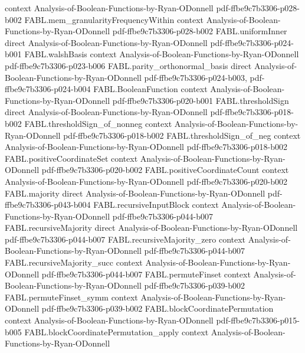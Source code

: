 \begin{theorem}
  {context}
  {Analysis-of-Boolean-Functions-by-Ryan-ODonnell}
  {pdf-ffbe9c7b3306-p028-b002}
\proofstep
  {FABL.mem_granularityFrequencyWithin}
  {context}
  {Analysis-of-Boolean-Functions-by-Ryan-ODonnell}
  {pdf-ffbe9c7b3306-p028-b002}
\proofstep
  {FABL.uniformInner}
  {direct}
  {Analysis-of-Boolean-Functions-by-Ryan-ODonnell}
  {pdf-ffbe9c7b3306-p024-b001}
\proofstep
  {FABL.walshBasis}
  {context}
  {Analysis-of-Boolean-Functions-by-Ryan-ODonnell}
  {pdf-ffbe9c7b3306-p023-b006}
\proofstep
  {FABL.parity_orthonormal_basis}
  {direct}
  {Analysis-of-Boolean-Functions-by-Ryan-ODonnell}
  {pdf-ffbe9c7b3306-p024-b003,
    pdf-ffbe9c7b3306-p024-b004}
\proofstep
  {FABL.BooleanFunction}
  {context}
  {Analysis-of-Boolean-Functions-by-Ryan-ODonnell}
  {pdf-ffbe9c7b3306-p020-b001}
\proofstep
  {FABL.thresholdSign}
  {direct}
  {Analysis-of-Boolean-Functions-by-Ryan-ODonnell}
  {pdf-ffbe9c7b3306-p018-b002}
\proofstep
  {FABL.thresholdSign_of_nonneg}
  {context}
  {Analysis-of-Boolean-Functions-by-Ryan-ODonnell}
  {pdf-ffbe9c7b3306-p018-b002}
\proofstep
  {FABL.thresholdSign_of_neg}
  {context}
  {Analysis-of-Boolean-Functions-by-Ryan-ODonnell}
  {pdf-ffbe9c7b3306-p018-b002}
\proofstep
  {FABL.positiveCoordinateSet}
  {context}
  {Analysis-of-Boolean-Functions-by-Ryan-ODonnell}
  {pdf-ffbe9c7b3306-p020-b002}
\proofstep
  {FABL.positiveCoordinateCount}
  {context}
  {Analysis-of-Boolean-Functions-by-Ryan-ODonnell}
  {pdf-ffbe9c7b3306-p020-b002}
\proofstep
  {FABL.majority}
  {direct}
  {Analysis-of-Boolean-Functions-by-Ryan-ODonnell}
  {pdf-ffbe9c7b3306-p043-b004}
\proofstep
  {FABL.recursiveInputBlock}
  {context}
  {Analysis-of-Boolean-Functions-by-Ryan-ODonnell}
  {pdf-ffbe9c7b3306-p044-b007}
\proofstep
  {FABL.recursiveMajority}
  {direct}
  {Analysis-of-Boolean-Functions-by-Ryan-ODonnell}
  {pdf-ffbe9c7b3306-p044-b007}
\proofstep
  {FABL.recursiveMajority_zero}
  {context}
  {Analysis-of-Boolean-Functions-by-Ryan-ODonnell}
  {pdf-ffbe9c7b3306-p044-b007}
\proofstep
  {FABL.recursiveMajority_succ}
  {context}
  {Analysis-of-Boolean-Functions-by-Ryan-ODonnell}
  {pdf-ffbe9c7b3306-p044-b007}
\proofstep
  {FABL.permuteFinset}
  {context}
  {Analysis-of-Boolean-Functions-by-Ryan-ODonnell}
  {pdf-ffbe9c7b3306-p039-b002}
\proofstep
  {FABL.permuteFinset_symm}
  {context}
  {Analysis-of-Boolean-Functions-by-Ryan-ODonnell}
  {pdf-ffbe9c7b3306-p039-b002}
\proofstep
  {FABL.blockCoordinatePermutation}
  {context}
  {Analysis-of-Boolean-Functions-by-Ryan-ODonnell}
  {pdf-ffbe9c7b3306-p015-b005}
\proofstep
  {FABL.blockCoordinatePermutation_apply}
  {context}
  {Analysis-of-Boolean-Functions-by-Ryan-ODonnell}

\end{theorem}
